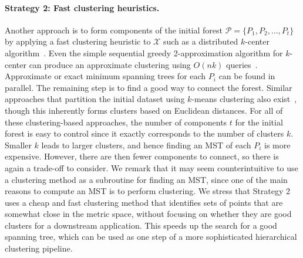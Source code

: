 \paragraph{Strategy 2: Fast clustering heuristics.}
Another approach is to form components of the initial forest $\mathcal{P} = \{P_1, P_2, \hdots, P_t\}$ by applying a fast clustering heuristic to $\mathcal{X}$ such as a distributed $k$-center algorithm~\cite{malkomes2015fast,mcclintock2016efficient}. Even the simple sequential greedy 2-approximation algorithm for $k$-center can produce an approximate clustering using $O(nk)$ queries~\cite{gonzalez1985clustering}. Approximate or exact minimum spanning trees for each $P_i$ can be found in parallel. The remaining step is to find a good way to connect the forest. Similar approaches that partition the initial dataset using $k$-means clustering also exist~\cite{zhong2015fast,jothi2018fast}, though this inherently forms clusters based on Euclidean distances. For all of these clustering-based approaches, the number of components $t$ for the initial forest is easy to control since it exactly corresponds to the number of clusters $k$. Smaller $k$ leads to larger clusters, and hence finding an MST of each $P_i$ is more expensive. However, there are then fewer components to connect, so there is again a trade-off to consider. 
%
We remark that it may seem counterintuitive to use a clustering method as a subroutine for finding an MST, since one of the main reasons to compute an MST is to perform clustering. We stress that Strategy 2 uses a cheap and fast clustering method that identifies sets of points that are somewhat close in the metric space, without focusing on whether they are good clusters for a downstream application. This speeds up the search for a good spanning tree, which can be used as one step of a more sophisticated hierarchical clustering pipeline. \\


